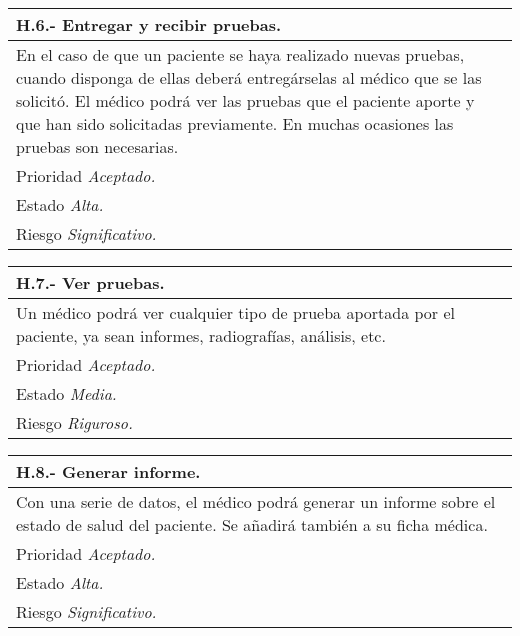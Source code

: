 	\begin{center}
	\begin{tabulary}{15cm}{|L|}
		\hline
			\bf{H.6.- Entregar y recibir pruebas.} \\
		\hline
			En el caso de que un paciente se haya realizado nuevas pruebas, cuando disponga de ellas deberá entregárselas al médico que se las solicitó. El médico podrá ver las pruebas que el paciente aporte y que han sido solicitadas previamente. En muchas ocasiones las pruebas son necesarias. \\
		\hline
			Prioridad \textit{Aceptado.} \\
		\hline
			Estado \textit{Alta.} \\
		\hline
			Riesgo \textit{Significativo.} \\
		\hline
	\end{tabulary}
	\end{center}

	\begin{center}
	\begin{tabulary}{15cm}{|L|}
		\hline
			\bf{H.7.- Ver pruebas.} \\
		\hline
			Un médico podrá ver cualquier tipo de prueba aportada por el paciente, ya sean informes, radiografías, análisis, etc. \\
		\hline
			Prioridad \textit{Aceptado.} \\
		\hline
			Estado \textit{Media.} \\
		\hline
			Riesgo \textit{Riguroso.} \\
		\hline
	\end{tabulary}
	\end{center}

	\begin{center}
	\begin{tabulary}{15cm}{|L|}
		\hline
			\bf{H.8.- Generar informe.} \\
		\hline
			Con una serie de datos, el médico podrá generar un informe sobre el estado de salud del paciente. Se añadirá también a su ficha médica. \\
		\hline
			Prioridad \textit{Aceptado.} \\
		\hline
			Estado \textit{Alta.} \\
		\hline
			Riesgo \textit{Significativo.} \\
		\hline
	\end{tabulary}
	\end{center}

